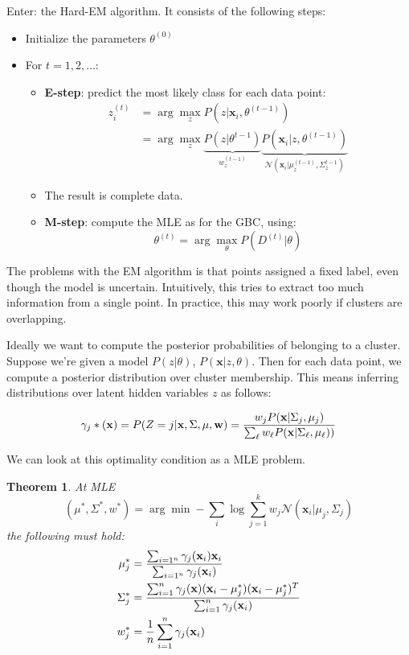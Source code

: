 \documentclass[a4paper,10pt,twoside]{article}
\newtheorem{theorem}{Theorem}
\begin{document}
Enter: the Hard-EM algorithm. It consists of the following steps:


\begin{itemize}
\item Initialize the parameters $\theta^{(0)}$
\item For $t=1,2,\ldots$:
  \begin{itemize}
  \item \textbf{E-step}: predict the most likely class for each data point:
    \begin{align*}
      z_i^{(t)}&=\arg\max_{z}P(z|\mathbf{x}_i,\theta^{(t-1)})\\
      &= \arg\max_{z}\underbrace{P(z|\theta^{t-1})}_{w_z^{(t-1)}} \underbrace{P(\mathbf{x}_i|z,\theta^{(t-1)})}_{\mathcal{N}(\mathbf{x}_i|\mu_z^{(t-1)},\Sigma_z^{t-1})}
    \end{align*}
  \item The result is complete data.
  \item \textbf{M-step}: compute the MLE as for the GBC, using:
    \begin{equation*}
      \theta^{(t)}=\arg\max_{\theta}P(D^{(t)}|\theta)
    \end{equation*}
  \end{itemize}
\end{itemize}

The problems with the EM algorithm is that points assigned a fixed label, even though the model is uncertain. Intuitively, this tries to extract too much information from a single point. In practice, this may work poorly if clusters are overlapping.

Ideally we want to compute the posterior probabilities of belonging to a cluster. Suppose we're given a model $P(z|\theta)$, $P(\mathbf{x}|z,\theta)$. Then for each data point, we compute a posterior distribution over cluster membership. This means inferring distributions over latent hidden variables $z$ as follows:

\begin{equation*}
  \gamma_j*(\mathbf{x}) = P(Z=j|\mathbf{x},\Sigma,\mu,\mathbf{w}) = {w_j P(\mathbf{x}|\Sigma_j,\mu_j)\over \sum_{\ell}w_{\ell}P(\mathbf{x}|\Sigma_{\ell},\mu_{\ell}))}
\end{equation*}

We can look at this optimality condition as a MLE problem.

\begin{theorem}
  At MLE
  \begin{equation*}
    (\mu^*,\Sigma^*,w^*)=\arg\min-\sum_i\log\sum_{j=1}^kw_j\mathcal{N}(\mathbf{x}_i|\mu_j,\Sigma_j)
  \end{equation*}
  the following must hold:
  \begin{align*}
    \mu_j^*&={\sum_{i=1^n}\gamma_j(\mathbf{x}_i)\mathbf{x}_i\over \sum_{i=1^n}\gamma_j(\mathbf{x}_i)}\\ \Sigma_j^*&={\sum_{i=1}^{n}\gamma_j(\mathbf{x})(\mathbf{x}_i-\mu_j^*)(\mathbf{x}_i-\mu_j^*)^T \over\sum_{i=1}^n\gamma_j(\mathbf{x}_i)}\\
    w_j^*&={1\over n}\sum_{i=1}^{n}\gamma_j(\mathbf{x}_i)
  \end{align*}
\end{theorem}
\end{document}
